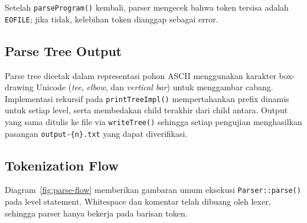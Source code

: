 \documentclass[11pt,a4paper]{article}
\begin{document}
Setelah \texttt{parseProgram()} kembali, parser mengecek bahwa token tersisa
adalah \texttt{EOFILE}; jika tidak, kelebihan token dianggap sebagai error.

\subsection{Parse Tree Output}

Parse tree dicetak dalam representasi pohon ASCII menggunakan karakter box-drawing
Unicode (\textit{tee}, \textit{elbow}, dan \textit{vertical bar}) untuk menggambar
cabang. Implementasi rekursif pada
\texttt{printTreeImpl()} mempertahankan prefix dinamis untuk setiap level,
serta membedakan child terakhir dari child antara. Output yang sama ditulis ke
file via \texttt{writeTree()} sehingga setiap pengujian menghasilkan pasangan
\texttt{output-\{n\}.txt} yang dapat diverifikasi.

\subsection{Tokenization Flow}

Diagram~\ref{fig:parse-flow} memberikan gambaran umum eksekusi
\texttt{Parser::parse()} pada level statement. Whitespace dan komentar telah
dibuang oleh lexer, sehingga parser hanya bekerja pada barisan token.
\end{document}
